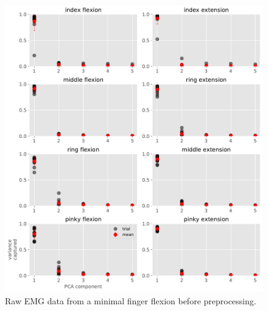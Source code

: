 \documentclass[
  a4paper,
]{article}
\makeatletter
\newcounter{figno}
\newenvironment{fignos:no-prefix-figure-caption}{
  \caption@ifcompatibility{}{
    \let\oldthefigure\thefigure
    \let\oldtheHfigure\theHfigure
    \renewcommand{\thefigure}{figno:\thefigno}
    \renewcommand{\theHfigure}{figno:\thefigno}
    \stepcounter{figno}
    \captionsetup{labelformat=empty}
  }
}{
  \caption@ifcompatibility{}{
    \captionsetup{labelformat=default}
    \let\thefigure\oldthefigure
    \let\theHfigure\oldtheHfigure
    \addtocounter{figure}{-1}
  }
}
\makeatother
\begin{document}
\begin{fignos:no-prefix-figure-caption}

\begin{figure}
\centering
\includegraphics{images/data_analysis/fingers/PCA_variances.pdf}
\caption{Raw EMG data from a minimal finger flexion before
preprocessing.}
\end{figure}

\end{fignos:no-prefix-figure-caption}
\end{document}
